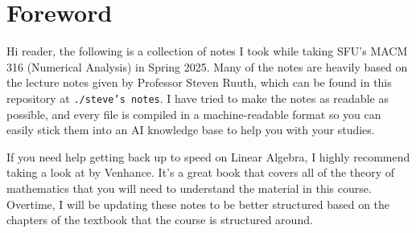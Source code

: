 \section*{Foreword}

Hi reader, the following is a collection of notes I took while taking SFU's MACM
316 (Numerical Analysis) in Spring 2025. Many of the notes are heavily based on
the lecture notes given by Professor Steven Ruuth, which can be found in this
repository at \texttt{./steve's notes}. I have tried to make the notes as
readable as possible, and every file is compiled in a machine-readable format so
you can easily stick them into an AI knowledge base to help you with your
studies.

If you need help getting back up to speed on Linear Algebra, I highly recommend
taking a look at  by Venhance. It's a great book that covers all of the
theory of mathematics that you will need to understand the material in this
course.
Overtime, I will be updating these notes to be better structured based on the
chapters of the textbook that the course is structured around.
